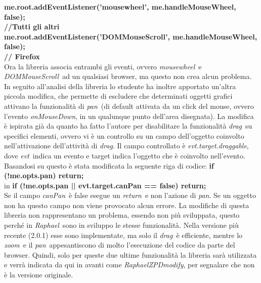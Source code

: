 \hspace*{10mm} \textbf{me.root.addEventListener(’mousewheel’, me.handleMouseWheel, false);\\ \hspace*{10mm} //Tutti gli altri \\
\hspace*{10mm} me.root.addEventListener(’DOMMouseScroll’, me.handleMouseWheel, false); \\ 
\hspace*{10mm} // Firefox} \\ \newline
Ora la libreria associa entrambi gli eventi, ovvero \textit{mousewheel}\ e \textit{DOMMouseScroll}\ ad un qualsiasi browser, ma questo non crea alcun problema. In seguito all'analisi della libreria lo studente ha inoltre apportato un'altra piccola modifica, che permette di escludere che determinati oggetti grafici attivano la funzionalità di \textit{pan}\ (di default attivata da un click del mouse, ovvero l'evento \textit{onMouseDown}, in un qualunque punto dell'area disegnata).
La modifica è ispirata già da quanto ha fatto l'autore per disabilitare la funzionalità \textit{drag}\ su specifici elementi, ovvero vi è un controllo su un campo dell'oggetto coinvolto nell'attivazione dell'attività di \textit{drag}. Il campo controllato è \textit{evt.target.draggable}, dove \textit{evt}\ indica un evento e target indica l'oggetto che è coinvolto nell'evento.
Basandosi su questo è stata modificata la seguente riga di codice: \newline \newline
\hspace*{10mm} \textbf{if (!me.opts.pan) return;}\\ 
\newline
in \newline \newline
\hspace*{10mm} \textbf{if (!me.opts.pan || evt.target.canPan == false) return;}\\ 
\newline
Se il campo \textit{canPan}\ è false esegue un \textit{return}\ e non l'azione di \textit{pan}. Se un oggetto non ha questo campo non viene provocato alcun errore.
La modifiche di questa libreria non rappresentano un problema, essendo non più sviluppata, questo perché in \textit{Raphael}\ sono in sviluppo le stesse funzionalità. Nella versione più recente (2.0.1) esse sono implementate, ma solo il \textit{drag}\ è efficiente, mentre lo \textit{zoom}\ e il \textit{pan}\ appesantiscono di molto l'esecuzione del codice da parte del browser. Quindi, solo per queste due ultime funzionalità la libreria sarà utilizzata e verrà indicata da qui in avanti come \textit{RaphaelZPDmodify}, per segnalare che non è la versione originale.
\newpage

